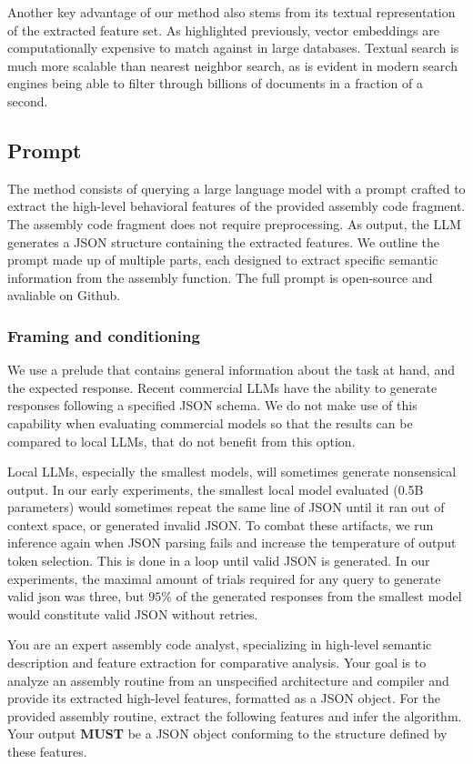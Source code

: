 \documentclass[conference,compsoc]{IEEEtran}
\begin{document}
Another key advantage of our method also stems from its textual representation of the extracted feature set. As highlighted
previously, vector embeddings are computationally expensive to match against in large databases. Textual search is much
more scalable than nearest neighbor search, as is evident in modern search engines being able to filter through billions of documents
in a fraction of a second.

\subsection{Prompt}

The method consists of querying a large language model with a prompt crafted to extract the high-level behavioral features of
the provided assembly code fragment. The assembly code fragment does not require preprocessing. As output, the LLM generates a JSON
structure containing the extracted features. We outline the prompt made up of multiple parts, each designed to
extract specific semantic information from the assembly function. The full prompt is open-source and avaliable on Github.

\subsubsection{Framing and conditioning}

We use a prelude that contains general information about the task at hand, and the expected response.
Recent commercial LLMs have the ability to generate responses following a specified JSON schema. We do not
make use of this capability when evaluating commercial models so that the results can be compared to local LLMs,
that do not benefit from this option.

Local LLMs, especially the smallest models, will sometimes generate nonsensical output. In our early experiments, the smallest local model
evaluated (0.5B parameters) would sometimes repeat the same line of JSON until it ran out of context space, or generated invalid JSON.
To combat these artifacts, we run inference again when JSON parsing fails and increase the temperature of output token
selection. This is done in a loop until valid JSON is generated. In our experiments, the maximal amount of trials required
for any query to generate valid json was three, but \(95\%\) of the generated responses from the smallest model would constitute
valid JSON without retries.

\begin{tcolorbox}[title={Prompt preamble}]
You are an expert assembly code analyst, specializing in high-level semantic description and feature extraction for comparative
analysis. Your goal is to analyze an assembly routine from an unspecified architecture and compiler and provide its extracted
high-level features, formatted as a JSON object. For the provided assembly routine, extract the following features and infer the
algorithm. Your output \textbf{MUST} be a JSON object conforming to the structure defined by these features.
\end{tcolorbox}
\end{document}
